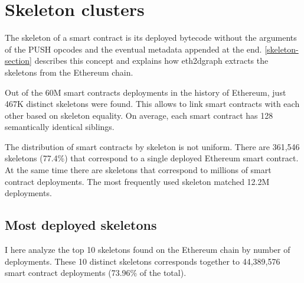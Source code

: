 \newpage

\section{Skeleton clusters}

The skeleton of a smart contract is its deployed bytecode without the arguments of the PUSH opcodes and the eventual metadata appended at the end. \cref{skeleton-section} describes this concept and explains how eth2dgraph extracts the skeletons from the Ethereum chain.

Out of the 60M smart contracts deployments in the history of Ethereum, just 467K distinct skeletons were found. This allows to link smart contracts with each other based on skeleton equality. On average, each smart contract has 128 semantically identical siblings. 

The distribution of smart contracts by skeleton is not uniform. There are 361,546 skeletons (77.4\%) that correspond to a single deployed Ethereum smart contract. At the same time there are skeletons that correspond to millions of smart contract deployments. The most frequently used skeleton matched 12.2M deployments.

\subsection{Most deployed skeletons}

I here analyze the top 10 skeletons found on the Ethereum chain by number of deployments. These 10 distinct skeletons corresponds together to 44,389,576 smart contract deployments (73.96\% of the total).

